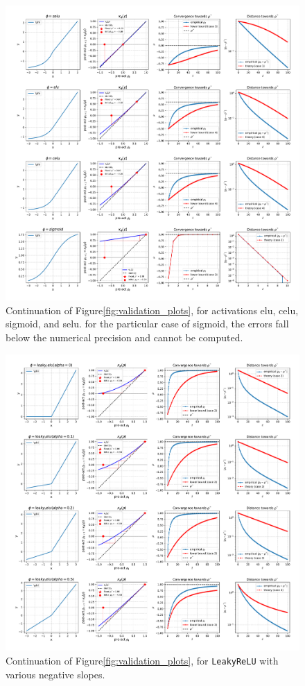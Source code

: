 \documentclass[twoside]{article}
\theoremstyle{definition}
\begin{document}
\begin{figure}[ht]
    \centering
    \includegraphics[width=\textwidth]{./kernel_convergence_2.pdf}
    \caption{\small Continuation of Figure\ref{fig:validation_plots}, for activations elu, celu, sigmoid, and selu. for the particular case of sigmoid, the errors fall below the numerical precision and cannot be computed.}
    \label{fig:validation_plots2}
\end{figure}

\begin{figure}[ht]
    \centering
    \includegraphics[width=\textwidth]{./kernel_convergence_leaky_relu.pdf}
    \caption{\small Continuation of Figure\ref{fig:validation_plots}, for \texttt{LeakyReLU} with various negative slopes. }
    \label{fig:leaky_relu}
\end{figure}
\end{document}
